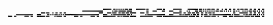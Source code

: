 \documentclass[10pt]{article}
\theoremstyle{plain}
\theoremstyle{definition}
\begin{document}
\begin{table*}[b]
{\begin{minipage}{5.32in}
\[\begin{array}{@{}r@{}}
\begin{array}{@{}l@{}}
\end{array}
\mynnl
\begin{array}{@{}l@{}}
\a\a\a\a\a\a\a\a\a\a\a\a\a\a\a\a\a\a\a\a\a\a\a\a\a\a\a\a\a\a\a\a\a\a\a\a \a\a\a\a\a\a\a\a\a\a\a\a\a\a\a\a\a\a\a\a\a\a\a\a\a\a\a\a\a\a\a\a\a\a\a\a \a\a\a\a\a\a\a\a\a\a\a\a\a\a\a\a\a\a\a\a\a\a\a\a\a\a\a\a\b\b\b\b\b\b\b\b \a\a\b\b\a\b\a\b\a\b\a\b\a\b\b\b\a\b\b\b\a\a\a\a\b\b\b\b\b\b\b\b\b\a\b\b \a\a\a\a\a\a\a\a\b\b\b\b\b\a\b\b\a\a\a\a\a\a\a\a\b\b\b\b\b\b\b\b\a\a\a\a \a\a\b\b\b\b\b\b\b\b\b\b\a\b\b\b\a\b\a\b\a\b\b\b\a\b\b\b\a\a\b\b\a\a\a\b \a\a\b\b\a\a\b\b\a\a\b\b\a\a\b\b\a\b\b\b\a\b\b\b\a\a\b\b\a\a\b\b\a\a\b\b \a\a\b\b\mynl
\a\a\a\a\a\a\a\a\a\a\a\a\a\a\a\a\a\a\a\a\a\a\a\a\a\a\a\a\a\a\a\a\a\a\a\a \a\a\a\a\a\a\a\a\a\a\a\a\a\a\a\a\a\a\a\a\a\a\a\a\a\a\a\a\a\a\a\a\a\a\a\a \a\a\a\a\a\a\a\a\b\b\b\b\b\b\b\b\b\b\b\b\b\b\b\b\b\b\b\b\a\a\a\a\a\a\a\a \a\b\a\b\b\b\a\b\b\b\b\b\b\b\a\b\b\b\b\b\a\a\a\a\a\a\a\a\a\a\a\a\a\a\b\b \a\a\a\a\b\b\b\b\a\a\a\a\a\b\b\b\a\a\a\a\b\b\b\b\a\a\a\a\a\a\b\b\a\a\a\a \a\b\a\b\a\a\a\a\a\b\b\b\a\b\b\b\a\b\a\b\a\b\a\b\a\b\a\b\a\b\b\b\a\b\b\b \a\b\a\b\a\b\a\b\a\a\b\b\a\b\a\b\a\a\a\b\a\b\a\b\a\b\b\b\a\b\b\b\a\b\a\b \a\b\a\b\mynl
\a\a\a\a\a\a\a\a\a\a\a\a\a\a\a\a\a\a\a\a\a\a\a\a\a\a\a\a\a\a\a\a\a\a\a\a \a\a\a\a\b\b\b\b\a\b\b\b\a\a\a\b\a\a\b\b\a\a\b\b\a\a\b\b\a\a\a\a\a\a\a\a \a\a\a\a\a\a\a\a\a\a\a\a\a\a\a\a\a\a\a\a\a\a\a\a\b\b\b\b\a\a\a\a\b\b\b\b \a\b\b\b\b\a\a\b\b\a\b\b\b\a\b\b\b\a\b\b\b\b\b\b\a\a\a\a\b\b\b\b\a\a\b\b \a\a\a\a\a\a\a\a\a\a\a\a\a\a\a\a\a\a\a\a\a\a\a\a\b\b\b\b\b\b\b\b\a\a\b\b \a\a\b\b\b\a\b\b\b\a\b\b\b\a\a\b\b\a\a\b\b\a\b\b\b\a\b\b\a\a\a\a\a\a\a\a \a\a\a\a\a\a\a\a\a\a\b\b\a\a\a\a\b\b\b\b\b\b\b\b\a\a\b\b\a\a\b\b\a\a\b\b \a\a\b\b\mynl
\a\a\a\a\a\a\a\a\a\a\a\a\a\a\a\a\b\b\b\b\b\b\b\b\b\b\b\b\b\b\b\b\a\a\a\a \b\b\b\b\a\a\a\a\a\a\b\b\a\b\a\b\a\b\b\b\a\b\a\b\a\b\a\b\b\b\b\b\b\b\b\b \b\b\b\b\b\b\b\b\b\b\b\b\b\b\b\b\b\b\b\b\b\b\b\b\a\a\a\a\b\b\b\b\a\a\a\a \b\a\b\b\b\b\b\b\b\b\b\b\b\b\a\b\b\b\a\b\a\a\a\a\a\a\a\a\a\a\a\a\a\b\a\b \b\b\b\b\b\b\b\b\b\b\b\b\b\b\b\b\a\a\a\a\b\b\b\b\a\a\a\a\a\a\b\b\a\b\a\b \b\b\b\b\a\b\a\b\b\b\a\b\b\a\a\b\b\a\b\b\b\a\a\b\b\a\b\b\b\b\b\b\b\b\b\b \b\b\b\b\b\b\b\b\a\b\a\b\b\b\b\b\a\a\a\a\b\a\b\b\a\b\b\b\a\b\b\b\a\b\a\b \a\b\a\b\mynl
\a\a\a\a\a\a\a\a\b\b\b\b\a\a\b\b\a\a\a\a\a\a\a\a\b\b\b\b\a\a\b\b\a\a\a\a \b\b\b\b\b\b\b\b\a\b\b\b\a\a\a\a\a\b\a\b\b\b\b\b\a\a\b\b\a\a\a\a\a\a\a\a \b\b\b\b\a\a\b\b\a\a\a\a\a\a\a\a\b\b\b\b\a\a\b\b\a\a\a\a\b\b\b\b\b\b\b\b \b\b\b\b\a\a\b\b\a\b\a\b\b\b\b\b\b\a\b\b\b\b\b\b\a\a\a\a\b\b\b\b\b\b\b\b \b\b\b\b\a\a\a\a\b\b\b\b\b\a\b\b\b\b\b\b\b\b\b\b\b\b\b\b\b\b\b\b\b\b\b\b \b\b\a\b\b\b\b\b\b\a\b\b\b\a\a\b\a\a\b\b\b\b\b\b\a\b\b\b\b\a\a\b\a\a\a\a \b\b\b\b\a\a\b\b\b\b\a\b\b\b\b\b\b\b\b\b\a\b\b\b\b\b\a\b\b\b\a\b\b\b\b\b \a\a\b\b\mynl

\end{array}
\end{array}\]
\end{minipage}}
\end{table*}
\end{document}
